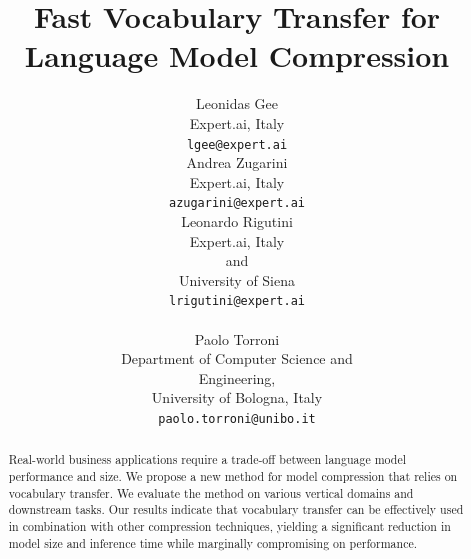 \documentclass[11pt]{article}
\title{Fast Vocabulary Transfer for Language Model Compression}
\author{Leonidas Gee\\
  Expert.ai, Italy \\
  \texttt{lgee@expert.ai} \\ \And
  Andrea Zugarini\\
  Expert.ai, Italy \\
  \texttt{azugarini@expert.ai} \\ \AND
  Leonardo Rigutini\\
  Expert.ai, Italy \\ and \\ University of Siena \\
  \texttt{lrigutini@expert.ai} \\
  \\ \And
  Paolo Torroni \\
  Department of Computer Science and \\ Engineering, \\ University of Bologna, Italy\\
  \texttt{paolo.torroni@unibo.it} \\
}
\begin{document}
\maketitle

\begin{abstract}

Real-world business applications require a trade-off between language model performance and size. We propose a new method for model compression that relies on vocabulary transfer. We evaluate the method on various vertical domains and downstream tasks. Our results indicate that vocabulary transfer can be effectively used in combination with other compression techniques, yielding a significant reduction in model size and inference time while marginally compromising on performance.




\end{abstract}
\end{document}
